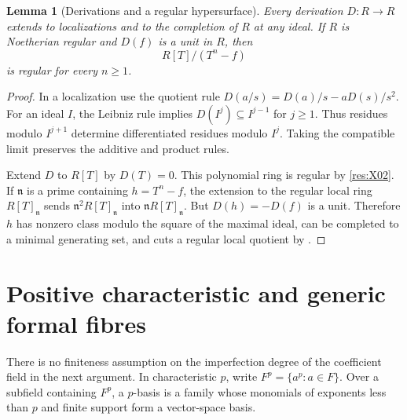 \documentclass[11pt,oneside,openany]{book}
\newtheorem{lemma}[theorem]{Lemma}
\theoremstyle{definition}
\theoremstyle{remark}
\begin{document}
\begin{lemma}[Derivations and a regular hypersurface]\label{res:X03}
Every derivation \(D:R\to R\) extends to localizations and to the completion of \(R\) at any ideal. If \(R\) is Noetherian regular and \(D(f)\) is a unit in \(R\), then
\[
             R[T]/(T^n-f)
\]
is regular for every \(n\geq 1\).
\end{lemma}
\begin{proof}
In a localization use the quotient rule
\(D(a/s)=D(a)/s-aD(s)/s^2\). For an ideal \(I\), the Leibniz rule implies
\(D(I^j)\subseteq I^{j-1}\) for \(j\geq1\). Thus residues modulo \(I^{j+1}\) determine differentiated residues modulo \(I^j\). Taking the compatible limit preserves the additive and product rules.

Extend \(D\) to \(R[T]\) by \(D(T)=0\). This polynomial ring is regular by \ref{res:X02}. If \(\mathfrak n\) is a prime containing \(h=T^n-f\), the extension to the regular local ring \(R[T]_{\mathfrak n}\) sends \(\mathfrak n^2R[T]_{\mathfrak n}\) into \(\mathfrak nR[T]_{\mathfrak n}\). But \(D(h)=-D(f)\) is a unit. Therefore \(h\) has nonzero class modulo the square of the maximal ideal, can be completed to a minimal generating set, and cuts a regular local quotient by \cite[CM-08]{core}.
\end{proof}

\section[Generic formal fibres]{Positive characteristic and generic formal fibres}

There is no finiteness assumption on the imperfection degree of the coefficient field in the next argument. In characteristic \(p\), write \(F^p=\{a^p:a\in F\}\). Over a subfield containing \(F^p\), a \(p\)-basis is a family whose monomials of exponents less than \(p\) and finite support form a vector-space basis.
\end{document}
